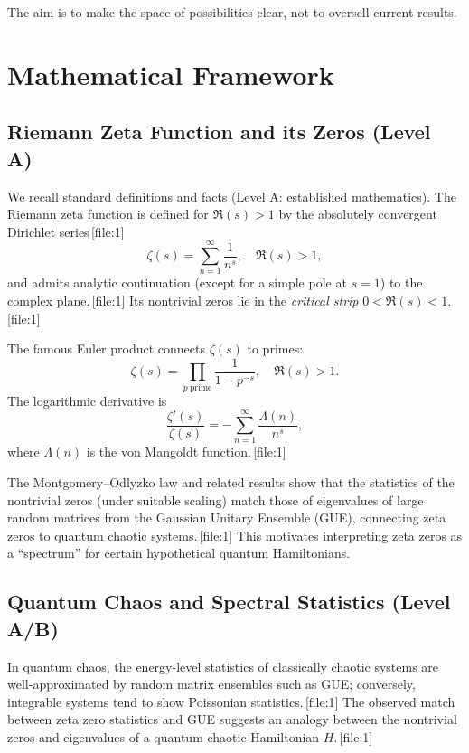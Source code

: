 \documentclass[11pt]{article}
\begin{document}
The aim is to make the space of possibilities clear, not to oversell current results.

\section{Mathematical Framework}
\label{sec:math-framework}

\subsection{Riemann Zeta Function and its Zeros (Level A)}

We recall standard definitions and facts (Level A: established mathematics). The Riemann zeta function is defined for \(\Re(s) > 1\) by the absolutely convergent Dirichlet series\,[file:1]
\[
\zeta(s) = \sum_{n=1}^{\infty} \frac{1}{n^s}, \quad \Re(s) > 1,
\]
and admits analytic continuation (except for a simple pole at \(s = 1\)) to the complex plane.\,[file:1] Its nontrivial zeros lie in the \emph{critical strip} \(0 < \Re(s) < 1\).\,[file:1]

The famous Euler product connects \(\zeta(s)\) to primes:
\[
\zeta(s) = \prod_{p\ \text{prime}} \frac{1}{1 - p^{-s}}, \quad \Re(s) > 1.
\]
The logarithmic derivative is
\[
\frac{\zeta'(s)}{\zeta(s)} = - \sum_{n=1}^{\infty} \frac{\Lambda(n)}{n^s},
\]
where \(\Lambda(n)\) is the von Mangoldt function.\,[file:1]

The Montgomery--Odlyzko law and related results show that the statistics of the nontrivial zeros (under suitable scaling) match those of eigenvalues of large random matrices from the Gaussian Unitary Ensemble (GUE), connecting zeta zeros to quantum chaotic systems.\,[file:1] This motivates interpreting zeta zeros as a ``spectrum'' for certain hypothetical quantum Hamiltonians.

\subsection{Quantum Chaos and Spectral Statistics (Level A/B)}

In quantum chaos, the energy-level statistics of classically chaotic systems are well-approximated by random matrix ensembles such as GUE; conversely, integrable systems tend to show Poissonian statistics.\,[file:1] The observed match between zeta zero statistics and GUE suggests an analogy between the nontrivial zeros and eigenvalues of a quantum chaotic Hamiltonian \(H\).\,[file:1]
\end{document}
